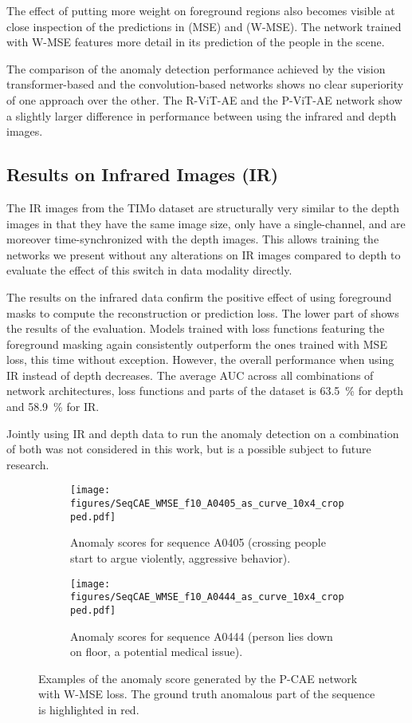 \documentclass[10pt,twocolumn,letterpaper]{article}
\begin{document}
The effect of putting more weight on foreground regions also becomes visible at close inspection of the predictions in  (MSE) and  (W-MSE). The network trained with W-MSE features more detail in its prediction of the people in the scene. 

The comparison of the anomaly detection performance achieved by the vision transformer-based and the convolution-based networks shows no clear superiority of one approach over the other. The R-ViT-AE and the P-ViT-AE network show a slightly larger difference in performance between using the infrared and depth images. 

\subsection{Results on Infrared Images (IR)}
The IR images from the TIMo dataset are structurally very similar to the depth images in that they have the same image size, only have a single-channel, and are moreover time-synchronized with the depth images. This allows training the networks we present without any alterations on IR images compared to depth to evaluate the effect of this switch in data modality directly.

The results on the infrared data confirm the positive effect of using foreground masks to compute the reconstruction or prediction loss. The lower part of  shows the results of the evaluation. Models trained with loss functions featuring the foreground masking again consistently outperform the ones trained with MSE loss, this time without exception. However, the overall performance when using IR instead of depth decreases. The average AUC across all combinations of network architectures, loss functions and parts of the dataset is \SI{63.5}{\percent} for depth and \SI{58.9}{\percent} for IR.

Jointly using IR and depth data to run the anomaly detection on a combination of both was not considered in this work, but is a possible subject to future research.

\begin{figure}[tb]
    \centering
    \begin{subfigure}{1\linewidth}
        \texttt{[image: figures/SeqCAE\_WMSE\_f10\_A0405\_as\_curve\_10x4\_cropped.pdf]}
        \caption{Anomaly scores for sequence A0405 (crossing people start to argue violently, \ie aggressive behavior).}
    \end{subfigure}
    \begin{subfigure}{1\linewidth}
        \texttt{[image: figures/SeqCAE\_WMSE\_f10\_A0444\_as\_curve\_10x4\_cropped.pdf]}
        \caption{Anomaly scores for sequence A0444 (person lies down on floor, \ie a potential medical issue).}
    \end{subfigure}
    \caption{Examples of the anomaly score generated by the P-CAE network with W-MSE loss. The ground truth anomalous part of the sequence is highlighted in red.}
    \label{fig:ano_score_examples}
\end{figure}
\end{document}
